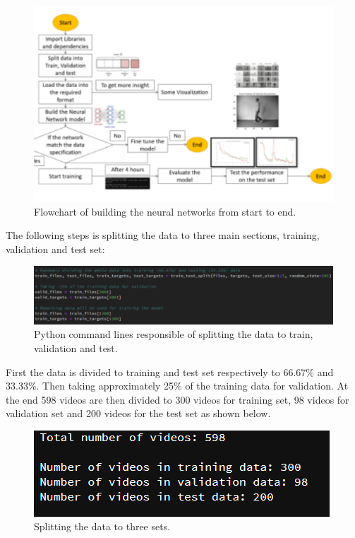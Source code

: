 \begin{figure}[]
\centering
\includegraphics{Figures/fn}
\decoRule
\caption[Flowchart of building the neural networks from start to end.]{Flowchart of building the neural networks from start to end.}
\label{fig:la}
\end{figure}
\newpage
The following steps is splitting the data to three main sections, training, validation and test set:
\begin{figure}[ht]
\centering
\includegraphics{Figures/ds}
\decoRule
\caption[Python command lines responsible of splitting the data to train, validation and test.]{Python command lines responsible of splitting the data to train, validation and test.}
\label{fig:la}
\end{figure}
First the data is divided to training and test set respectively to 66.67\% and 33.33\%. Then taking approximately 25\% of the training data for validation. At the end 598 videos are then divided to 300 videos for training set, 98 videos for validation set and 200 videos for the test set as shown below. 
\begin{figure}[ht]
\centering
\includegraphics{Figures/datasplitoutput}
\decoRule
\caption[Splitting the data to three sets]{Splitting the data to three sets.}
\label{fig:la}
\end{figure}
\newpage

